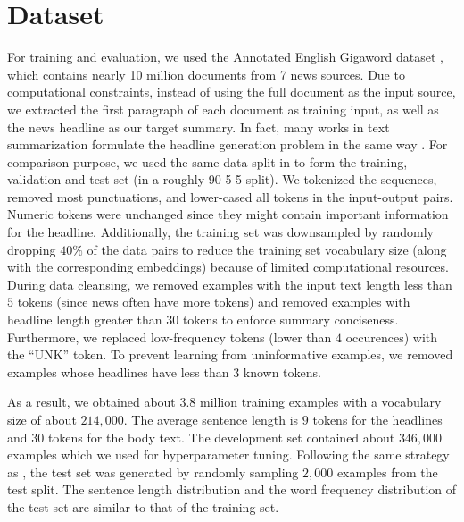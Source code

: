 \section{Dataset}
\label{sec: dataset}

For training and evaluation, we used the Annotated English Gigaword dataset \cite{graff2003english}, which contains nearly 10 million documents from 7 news sources. Due to computational constraints, instead of using the full document as the input source, we extracted the first paragraph of each document as training input, as well as the news headline as our target summary. In fact, many works in text summarization formulate the headline generation problem in the same way \cite{rush2015neural}. For comparison purpose, we used the same data split in \cite{rush2015neural} to form the training, validation and test set (in a roughly 90-5-5 split). We tokenized the sequences, removed most punctuations, and lower-cased all tokens in the input-output pairs. Numeric tokens were unchanged since they might contain important information for the headline. Additionally, the training set was downsampled by randomly dropping $40\%$ of the data pairs to reduce the training set vocabulary size (along with the corresponding embeddings) because of limited computational resources. During data cleansing, we removed examples with the input text length less than $5$ tokens (since news often have more tokens) and removed examples with headline length greater than $30$ tokens to enforce summary conciseness. Furthermore, we replaced low-frequency tokens (lower than $4$ occurences) with the ``UNK'' token. To prevent learning from uninformative examples, we removed examples whose headlines have less than $3$ known tokens. 

As a result, we obtained about $3.8$ million training examples with a vocabulary size of about $214,000$. The average sentence length is $9$ tokens for the headlines and $30$ tokens for the body text. The development set contained about $346,000$ examples which we used for hyperparameter tuning. Following the same strategy as \cite{rush2015neural}, the test set was generated by randomly sampling $2,000$ examples from the test split. The sentence length distribution and the word frequency distribution of the test set are similar to that of the training set.